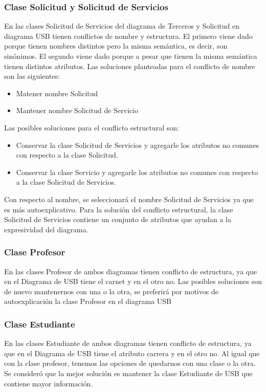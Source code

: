 \documentclass[12pt,a4paper,spanish]{article}
\begin{document}
\subsubsection{Clase Solicitud y Solicitud de Servicios}
\indent En las clases Solicitud de Servicios del diagrama de Terceros y Solicitud en diagrama USB tienen conflictos de nombre y estructura. El primero viene dado porque tienen nombres distintos pero la misma sem\'antica, es decir, son sin\'onimos. El segundo viene dado porque a pesar que tienen la misma sem\'antica tienen distintos atributos. 
\newline
\newline
\indent Las soluciones planteadas para el conflicto de nombre son las siguientes:
\begin{itemize}
\item Matener nombre Solicitud
\item Mantener nombre Solicitud de Servicio
\end{itemize}
\indent Las posibles soluciones para el conflicto estructural son:
\begin{itemize}
\item  Conservar la clase Solicitud de Servicios y agregarle los atributos no comunes con respecto a la clase Solicitud.
\item  Conservar la clase Servicio y agregarle los atributos no comunes con respecto a la clase Solicitud de Servicios.
\end{itemize}
\indent Con respecto al nombre, se seleccionar\'a el nombre Solicitud de Servicios ya que es m\'as autoexplicativo. Para la soluci\'on del conflicto estructural, la clase Solicitud de Servicios contiene un conjunto de atributos que ayudan a la expresividad del diagrama.
\subsubsection{Clase Profesor}
\indent En las clases Profesor de ambos diagramas tienen conflicto de estructura, ya que en el Diagrama de USB tiene el carnet y en el otro no. Las posibles soluciones son de nuevo mantenernos con una o la otra, se preferir\'a por motivos de autoexplicaci\'on la clase Profesor en el diagrama USB 
\subsubsection{Clase Estudiante}
\indent En las clases Estudiante de ambos diagramas tienen conflicto de estructura, ya que en el Diagrama de USB tiene el atributo carrera y en el otro no. Al igual que con la clase profesor, tenemos las opciones de quedarnos con una clase o la otra. Se consider\'o que la mejor soluci\'on es mantener la clase Estudiante de USB que contiene mayor informaci\'on.
\end{document}
